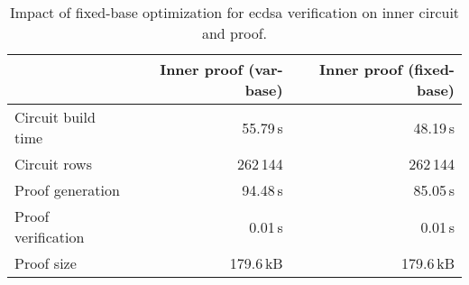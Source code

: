 \begin{table}[t]
	\centering
	\begin{tabular}{lrr}
		\toprule
		& \textbf{Inner proof (var-base)} & \textbf{Inner proof (fixed-base)} \\
		\midrule
		Circuit build time      & 55.79\,s    & 48.19\,s    \\
		Circuit rows            & 262\,144    & 262\,144    \\
		Proof generation        & 94.48\,s    & 85.05\,s    \\
		Proof verification      & 0.01\,s     & 0.01\,s    \\
		Proof size              & 179.6\,kB   & 179.6\,kB \\
		\bottomrule
	\end{tabular}
	\caption{Impact of fixed-base optimization for \acrshort{ecdsa} verification on inner circuit and proof.}
	\label{tab:plonky2-fixed-base}
\end{table}

